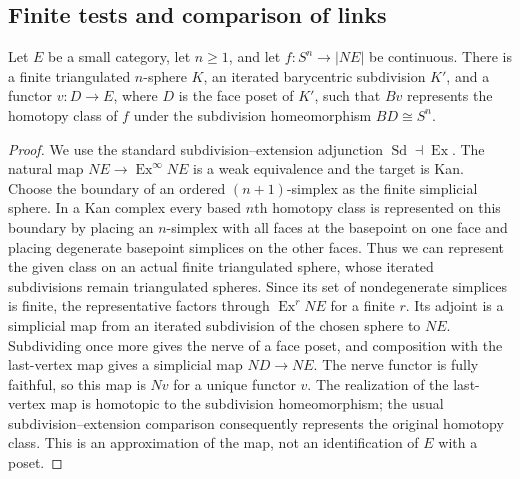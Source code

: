 \subsection{Finite tests and comparison of links}

\begin{lemma}
\label{C:finite-nerve}
Let $E$ be a small category, let $n\geq1$, and let
$f:S^n\to |NE|$ be continuous. There is a finite triangulated
$n$-sphere $K$, an iterated barycentric subdivision $K'$, and a
functor $v:D\to E$, where $D$ is the face poset of $K'$, such that
$Bv$ represents the homotopy class of $f$ under the subdivision
homeomorphism $BD\cong S^n$.
\end{lemma}
\begin{proof}
We use the standard subdivision--extension adjunction
$\operatorname{Sd}\dashv\operatorname{Ex}$. The natural map
$NE\to\operatorname{Ex}^{\infty}NE$ is a weak equivalence and the
target is Kan. Choose the boundary of an ordered $(n+1)$-simplex as the
finite simplicial sphere. In a Kan complex every based $n$th
homotopy class is represented on this boundary by placing an
$n$-simplex with all faces at the basepoint on one face and
placing degenerate basepoint simplices on the other faces.
Thus we can represent the given class on an actual finite
triangulated sphere, whose iterated subdivisions remain
triangulated spheres. Since its set of nondegenerate simplices
is finite, the representative factors through
$\operatorname{Ex}^{r}NE$ for a finite $r$. Its adjoint is a
simplicial map from an iterated subdivision of the chosen sphere to
$NE$. Subdividing once more gives the nerve of a face poset, and
composition with the last-vertex map gives a simplicial map
$ND\to NE$. The nerve functor is fully faithful, so this map is
$Nv$ for a unique functor $v$. The realization of the last-vertex
map is homotopic to the subdivision homeomorphism; the usual
subdivision--extension comparison consequently represents the
original homotopy class. This is an approximation of the map, not
an identification of $E$ with a poset.
\end{proof}

